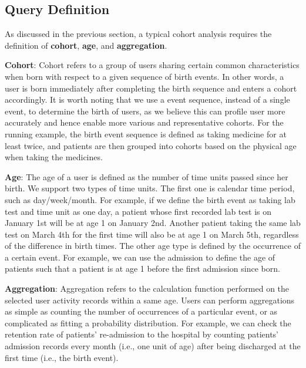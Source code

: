 \subsection{Query Definition}
As discussed in the previous section, a typical cohort analysis requires the definition of \textbf{cohort}, \textbf{age}, and \textbf{aggregation}. 

\textbf{Cohort}: Cohort refers to a group of users sharing certain common characteristics when born with respect to a given sequence of birth events. In other words, a user is born immediately after completing the birth sequence and enters a cohort accordingly. It is worth noting that we use a event sequence, instead of a single event, to determine the birth of users, as we believe this can profile user more accurately and hence enable more various and representative cohorts. For the running example, the birth event sequence is defined as taking medicine for at least twice, and patients are then grouped into cohorts based on the physical age when taking the medicines. %

\textbf{Age}: The age of a user is defined as the number of time units passed since her birth. We support two types of time units. The first one is calendar time period, such as day/week/month. For example, if we define the birth event as taking lab test and time unit as one day, a patient whose first recorded lab test is on January 1st will be at age 1 on January 2nd. 
Another patient taking the same lab test on March 4th for the first time will also be at age 1 on March 5th, regardless of the difference in birth times. The other age type is defined by the occurrence of a certain event. For example, we can use the admission to define the age of patients such that a patient is at age 1 before the first admission since born.

\textbf{Aggregation}: Aggregation refers to the calculation function performed on the selected user activity records within a same age. Users can perform aggregations as simple as counting the number of occurrences of a particular event, or as complicated as fitting a probability distribution. For example, we can check the retention rate of patients' re-admission to the hospital by counting patients' admission records every month (i.e., one unit of age) after being discharged at the first time (i.e., the birth event).

